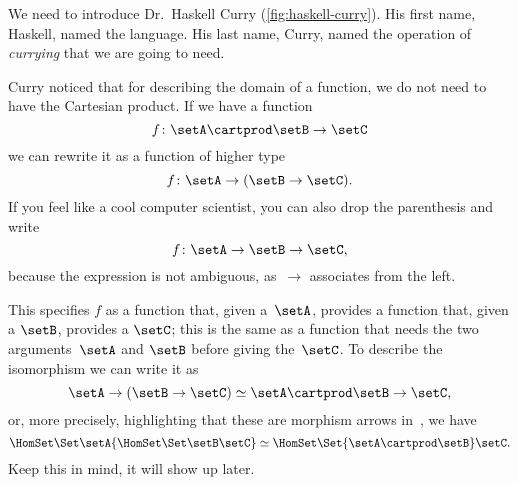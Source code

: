 We need to introduce Dr.~Haskell Curry (\cref{fig:haskell-curry}).
His first name,  Haskell, named the language.
His last name, Curry, named the operation of \emph{currying} that we are going to need.

Curry noticed that for describing the domain of a function, we do not need to have the Cartesian product.
If we have a function
\begin{equation}\label{eq:currying-1}
f \colon \setA \cartprod \setB \to \setC
\end{equation}
we can rewrite it as a function of higher type
\begin{equation}\label{eq:currying-2}
f \colon \setA \to ( \setB \to \setC).
\end{equation}
If you feel like a cool computer scientist, you can also drop the parenthesis and write
\begin{equation}\label{eq:currying-3}
f \colon \setA \to \setB \to \setC,
\end{equation}
because the expression is not ambiguous, as~$\to$ associates from the left.



This specifies $f$ as a function that, given a~$\setA$, provides a function that, given a $\setB$,
provides a $\setC$; this is the same as a function that needs the two arguments~$\setA$ and $\setB$ before giving the~$\setC$.  To describe the isomorphism we can write it as
\begin{equation}\label{eq:currying-iso-1}
  \setA \to ( \setB \to \setC) \simeq  \setA \cartprod \setB \to \setC,
\end{equation}
or, more precisely, highlighting that these are morphism arrows in~\Set, we have
\begin{equation}\label{eq:currying-iso-2}
  \HomSet\Set\setA{\HomSet\Set\setB\setC} \simeq \HomSet\Set{\setA \cartprod \setB}\setC.
\end{equation}
Keep this in mind, it will show up later.

